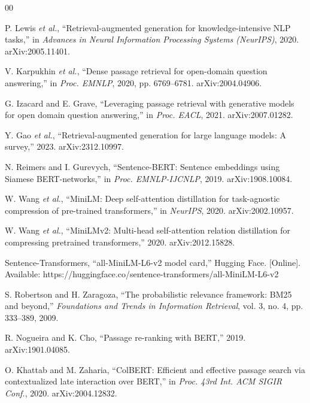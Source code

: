 \documentclass[conference]{IEEEtran}
\begin{document}
\begin{thebibliography}{00}
\scriptsize
\setlength{\itemsep}{0pt}
\setlength{\parsep}{0pt}
\setlength{\parskip}{0pt}

 P. Lewis \emph{et al.}, ``Retrieval-augmented generation for knowledge-intensive NLP tasks,'' in \emph{Advances in Neural Information Processing Systems (NeurIPS)}, 2020. arXiv:2005.11401.

 V. Karpukhin \emph{et al.}, ``Dense passage retrieval for open-domain question answering,'' in \emph{Proc. EMNLP}, 2020, pp. 6769--6781. arXiv:2004.04906.

 G. Izacard and E. Grave, ``Leveraging passage retrieval with generative models for open domain question answering,'' in \emph{Proc. EACL}, 2021. arXiv:2007.01282.

 Y. Gao \emph{et al.}, ``Retrieval-augmented generation for large language models: A survey,'' 2023. arXiv:2312.10997.

 N. Reimers and I. Gurevych, ``Sentence-BERT: Sentence embeddings using Siamese BERT-networks,'' in \emph{Proc. EMNLP-IJCNLP}, 2019. arXiv:1908.10084.

 W. Wang \emph{et al.}, ``MiniLM: Deep self-attention distillation for task-agnostic compression of pre-trained transformers,'' in \emph{NeurIPS}, 2020. arXiv:2002.10957.

 W. Wang \emph{et al.}, ``MiniLMv2: Multi-head self-attention relation distillation for compressing pretrained transformers,'' 2020. arXiv:2012.15828.

 Sentence-Transformers, ``all-MiniLM-L6-v2 model card,'' Hugging Face. [Online]. Available: https://huggingface.co/sentence-transformers/all-MiniLM-L6-v2

 S. Robertson and H. Zaragoza, ``The probabilistic relevance framework: BM25 and beyond,'' \emph{Foundations and Trends in Information Retrieval}, vol. 3, no. 4, pp. 333--389, 2009.

 R. Nogueira and K. Cho, ``Passage re-ranking with BERT,'' 2019. arXiv:1901.04085.

 O. Khattab and M. Zaharia, ``ColBERT: Efficient and effective passage search via contextualized late interaction over BERT,'' in \emph{Proc. 43rd Int. ACM SIGIR Conf.}, 2020. arXiv:2004.12832.


\end{thebibliography}
\end{document}
